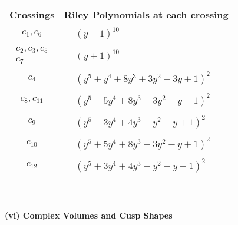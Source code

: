 \documentclass[1p]{elsarticle_modified}
\theoremstyle{definition}
\begin{document}
\begin{tabular}{m{50pt}|m{274pt}}
Crossings & \hspace{64pt}Riley Polynomials at each crossing \\
\hline $$\begin{aligned}c_{1},c_{6}\end{aligned}$$&$\begin{aligned}
&(y-1)^{10}
\end{aligned}$\\
\hline $$\begin{aligned}c_{2},c_{3},c_{5}\\c_{7}\end{aligned}$$&$\begin{aligned}
&(y+1)^{10}
\end{aligned}$\\
\hline $$\begin{aligned}c_{4}\end{aligned}$$&$\begin{aligned}
&(y^5+y^4+8 y^3+3 y^2+3 y+1)^2
\end{aligned}$\\
\hline $$\begin{aligned}c_{8},c_{11}\end{aligned}$$&$\begin{aligned}
&(y^5-5 y^4+8 y^3-3 y^2- y-1)^2
\end{aligned}$\\
\hline $$\begin{aligned}c_{9}\end{aligned}$$&$\begin{aligned}
&(y^5-3 y^4+4 y^3- y^2- y+1)^2
\end{aligned}$\\
\hline $$\begin{aligned}c_{10}\end{aligned}$$&$\begin{aligned}
&(y^5+5 y^4+8 y^3+3 y^2- y+1)^2
\end{aligned}$\\
\hline $$\begin{aligned}c_{12}\end{aligned}$$&$\begin{aligned}
&(y^5+3 y^4+4 y^3+y^2- y-1)^2
\end{aligned}$\\
\hline
\end{tabular}\\~\\
\newpage\flushleft \textbf{(vi) Complex Volumes and Cusp Shapes}
\end{document}
